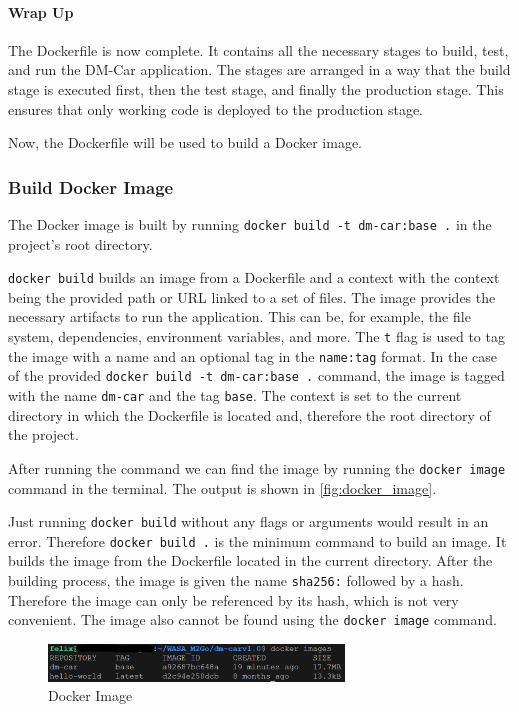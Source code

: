 \paragraph*{Wrap Up}
The Dockerfile is now complete.
It contains all the necessary stages to build, test, and run the DM-Car application.
The stages are arranged in a way that the build stage is executed first, then the test stage, and finally the production stage.
This ensures that only working code is deployed to the production stage.

Now, the Dockerfile will be used to build a Docker image.

\subsubsection*{Build Docker Image}
The Docker image is built by running \texttt{docker build -t dm-car:base .} in the project's root directory.

\texttt{docker build} builds an image from a Dockerfile and a context with the context being the provided path or URL linked to a set of files.
The image provides the necessary artifacts to run the application.
This can be, for example, the file system, dependencies, environment variables, and more.
The \texttt{\-t} flag is used to tag the image with a name and an optional tag in the \texttt{name:tag} format.
In the case of the provided \texttt{docker build -t dm-car:base .} command, the image is tagged with the name \texttt{dm-car} and the tag \texttt{base}.
The context is set to the current directory in which the Dockerfile is located and, therefore the root directory of the project.

After running the command we can find the image by running the \texttt{docker image} command in the terminal.
The output is shown in \autoref{fig:docker_image}.

Just running \texttt{docker build} without any flags or arguments would result in an error.
Therefore \texttt{docker build .} is the minimum command to build an image.
It builds the image from the Dockerfile located in the current directory.
After the building process, the image is given the name \texttt{sha256:} followed by a hash.
Therefore the image can only be referenced by its hash, which is not very convenient.
The image also cannot be found using the \texttt{docker image} command.

\begin{figure}
    \centering
    \includegraphics[width=0.7\textwidth]{figures/microservices/dmCar/ms_dmCar_dockerImages.png}
    \caption{Docker Image}
    \label{fig:docker_image}
\end{figure}


